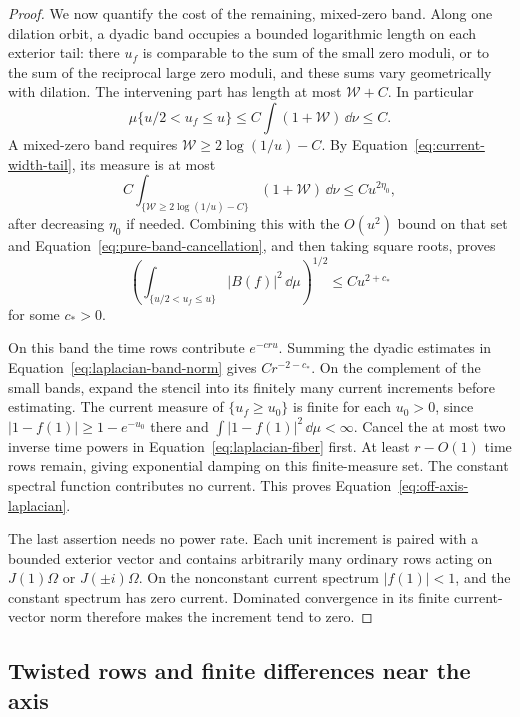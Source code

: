 \begin{proof}
We now quantify the cost of the remaining, mixed-zero band.  Along
one dilation orbit, a dyadic band occupies a bounded logarithmic
length on each exterior tail: there $u_f$ is comparable to the sum
of the small zero moduli, or to the sum of the reciprocal large
zero moduli, and these sums vary geometrically with dilation.
The intervening part has length at most $\mathcal W+C$.
In particular
\[
 \mu\{u/2<u_f\le u\}\le C\int(1+\mathcal W)\,\dd\nu\le C.
\]
A mixed-zero band requires
$\mathcal W\ge2\log(1/u)-C$.  By
Equation~\eqref{eq:current-width-tail}, its measure is at most
\[
 C\int_{\{\mathcal W\ge2\log(1/u)-C\}}
       (1+\mathcal W)\,\dd\nu
 \le C u^{2\eta_0},
\]
after decreasing $\eta_0$ if needed.  Combining this with the
$O(u^2)$ bound on that set and
Equation~\eqref{eq:pure-band-cancellation}, and then taking square
roots, proves
\begin{equation}\label{eq:laplacian-band-norm}
 \left(\int_{\{u/2<u_f\le u\}}|B(f)|^2\,\dd\mu\right)^{1/2}
 \le C u^{2+c_*}
\end{equation}
for some $c_*>0$.

On this band the time rows contribute $e^{-c r u}$.  Summing the
dyadic estimates in Equation~\eqref{eq:laplacian-band-norm} gives
$Cr^{-2-c_*}$.  On the complement of the small bands, expand the
stencil into its finitely many current increments before estimating.
The current measure of $\{u_f\ge u_0\}$ is finite for each $u_0>0$,
since $|1-f(1)|\ge1-e^{-u_0}$ there and
$\int|1-f(1)|^2\,\dd\mu<\infty$.  Cancel the at most two inverse
time powers in Equation~\eqref{eq:laplacian-fiber} first.  At least
$r-O(1)$ time rows remain, giving exponential damping on this
finite-measure set.  The constant spectral
function contributes no current.  This proves
Equation~\eqref{eq:off-axis-laplacian}.

The last assertion needs no power rate.  Each unit increment is
paired with a bounded exterior vector and contains arbitrarily many
ordinary rows acting on $J(1)\Omega$ or $J(\pm i)\Omega$.
On the nonconstant current spectrum $|f(1)|<1$, and the constant
spectrum has zero current.  Dominated convergence in its finite
current-vector norm therefore makes the increment tend to zero.
\end{proof}

\subsection{Twisted rows and finite differences near the axis}


